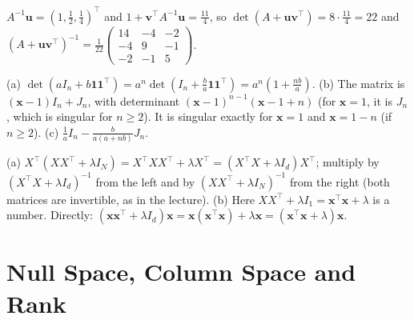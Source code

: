 \documentclass[11pt]{article}
\begin{document}
\begin{description}[leftmargin=0pt, itemsep=0.3em]
    \item[\ref{pr:sherman-morrison-practice}.] $A^{-1}\mathbf{u} = (1, \frac{1}{2}, \frac{1}{4})^\top$ and $1 + \mathbf{v}^\top A^{-1}\mathbf{u} = \frac{11}{4}$, so $\det(A + \mathbf{u}\mathbf{v}^\top) = 8 \cdot \frac{11}{4} = 22$ and $(A + \mathbf{u}\mathbf{v}^\top)^{-1} = \frac{1}{22}\begin{pmatrix} 14 & -4 & -2 \\ -4 & 9 & -1 \\ -2 & -1 & 5 \end{pmatrix}$.
    \item[\ref{pr:det-lemma-practice}.] (a) $\det(aI_n + b\mathbf{1}\mathbf{1}^\top) = a^n\det(I_n + \frac{b}{a}\mathbf{1}\mathbf{1}^\top) = a^n(1 + \frac{nb}{a})$. (b) The matrix is $(\mathbf{x} - 1)I_n + J_n$, with determinant $(\mathbf{x} - 1)^{n-1}(\mathbf{x} - 1 + n)$ (for $\mathbf{x} = 1$, it is $J_n$, which is singular for $n \geq 2$). It is singular exactly for $\mathbf{x} = 1$ and $\mathbf{x} = 1 - n$ (if $n \geq 2$). (c) $\frac{1}{a}I_n - \frac{b}{a(a + nb)}J_n$.
    \item[\ref{pr:push-through}.] (a) $X^\top(XX^\top + \lambda I_N) = X^\top XX^\top + \lambda X^\top = (X^\top X + \lambda I_d)X^\top$; multiply by $(X^\top X + \lambda I_d)^{-1}$ from the left and by $(XX^\top + \lambda I_N)^{-1}$ from the right (both matrices are invertible, as in the lecture). (b) Here $XX^\top + \lambda I_1 = \mathbf{x}^\top \mathbf{x} + \lambda$ is a number. Directly: $(\mathbf{x}\mathbf{x}^\top + \lambda I_d)\mathbf{x} = \mathbf{x}(\mathbf{x}^\top \mathbf{x}) + \lambda \mathbf{x} = (\mathbf{x}^\top \mathbf{x} + \lambda)\mathbf{x}$.
\end{description}

\section*{Null Space, Column Space and Rank}
\end{document}
